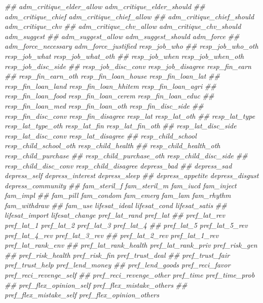 \documentclass[
]{article}
\newenvironment{Shaded}{\begin{snugshade}}{\end{snugshade}}
\newcommand{\CommentTok}[1]{\textcolor[rgb]{0.56,0.35,0.01}{\textit{#1}}}
\begin{document}
\begin{Shaded}
\begin{Highlighting}[]
\CommentTok{##      adm_critique_elder_allow adm_critique_elder_should}
\CommentTok{##      adm_critique_chief adm_critique_chief_allow}
\CommentTok{##      adm_critique_chief_should adm_critique_chv}
\CommentTok{##      adm_critique_chv_allow adm_critique_chv_should adm_suggest}
\CommentTok{##      adm_suggest_allow adm_suggest_should adm_force}
\CommentTok{##      adm_force_necessary adm_force_justified resp_job_who}
\CommentTok{##      resp_job_who_oth resp_job_what resp_job_what_oth}
\CommentTok{##      resp_job_when resp_job_when_oth resp_job_disc_side}
\CommentTok{##      resp_job_disc_conv resp_job_disagree resp_fin_earn}
\CommentTok{##      resp_fin_earn_oth resp_fin_loan_house resp_fin_loan_lat}
\CommentTok{##      resp_fin_loan_land resp_fin_loan_hhitem resp_fin_loan_agri}
\CommentTok{##      resp_fin_loan_food resp_fin_loan_cerem resp_fin_loan_educ}
\CommentTok{##      resp_fin_loan_med resp_fin_loan_oth resp_fin_disc_side}
\CommentTok{##      resp_fin_disc_conv resp_fin_disagree resp_lat resp_lat_oth}
\CommentTok{##      resp_lat_type resp_lat_type_oth resp_lat_fin resp_lat_fin_oth}
\CommentTok{##      resp_lat_disc_side resp_lat_disc_conv resp_lat_disagree}
\CommentTok{##      resp_child_school resp_child_school_oth resp_child_health}
\CommentTok{##      resp_child_health_oth resp_child_purchase}
\CommentTok{##      resp_child_purchase_oth resp_child_disc_side}
\CommentTok{##      resp_child_disc_conv resp_child_disagree depress_bad}
\CommentTok{##      depress_sad depress_self depress_interest depress_sleep}
\CommentTok{##      depress_appetite depress_disgust depress_community}
\CommentTok{##      fam_steril_f fam_steril_m fam_iucd fam_inject fam_impl}
\CommentTok{##      fam_pill fam_condom fam_emerg fam_lam fam_rhythm fam_withdraw}
\CommentTok{##      fam_use lifesat_ideal lifesat_cond lifesat_satis}
\CommentTok{##      lifesat_import lifesat_change pref_lat_rand pref_lat}
\CommentTok{##      pref_lat_rev pref_lat_1 pref_lat_2 pref_lat_3 pref_lat_4}
\CommentTok{##      pref_lat_5 pref_lat_5_rev pref_lat_4_rev pref_lat_3_rev}
\CommentTok{##      pref_lat_2_rev pref_lat_1_rev pref_lat_rank_env}
\CommentTok{##      pref_lat_rank_health pref_lat_rank_priv pref_risk_gen}
\CommentTok{##      pref_risk_health pref_risk_fin pref_trust_deal}
\CommentTok{##      pref_trust_fair pref_trust_help pref_lend_money}
\CommentTok{##      pref_lend_goods pref_reci_favor pref_reci_revenge_self}
\CommentTok{##      pref_reci_revenge_other pref_time pref_time_prob}
\CommentTok{##      pref_flex_opinion_self pref_flex_mistake_others}
\CommentTok{##      pref_flex_mistake_self pref_flex_opinion_others}

\end{Highlighting}
\end{Shaded}
\end{document}
